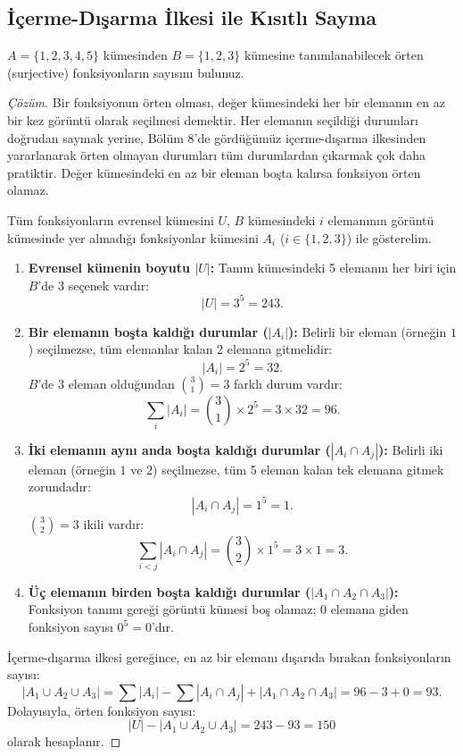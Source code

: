 \subsection{İçerme-Dışarma İlkesi ile Kısıtlı Sayma}

\begin{example}
$A = \{1, 2, 3, 4, 5\}$ kümesinden $B = \{1, 2, 3\}$ kümesine tanımlanabilecek örten (surjective) fonksiyonların sayısını bulunuz.
\end{example}

\begin{proof}[Çözüm]
Bir fonksiyonun örten olması, değer kümesindeki her bir elemanın en az bir kez görüntü olarak seçilmesi demektir. Her elemanın seçildiği durumları doğrudan saymak yerine, Bölüm 8'de gördüğümüz içerme-dışarma ilkesinden yararlanarak örten olmayan durumları tüm durumlardan çıkarmak çok daha pratiktir. Değer kümesindeki en az bir eleman boşta kalırsa fonksiyon örten olamaz.

Tüm fonksiyonların evrensel kümesini $U$, $B$ kümesindeki $i$ elemanının görüntü kümesinde yer almadığı fonksiyonlar kümesini $A_i$ ($i \in \{1, 2, 3\}$) ile gösterelim.

\begin{enumerate}
    \item \textbf{Evrensel kümenin boyutu $|U|$:}
    Tanım kümesindeki 5 elemanın her biri için $B$'de 3 seçenek vardır:
    \[
    |U| = 3^5 = 243.
    \]

    \item \textbf{Bir elemanın boşta kaldığı durumlar ($|A_i|$):}
    Belirli bir eleman (örneğin $1$) seçilmezse, tüm elemanlar kalan 2 elemana gitmelidir:
    \[
    |A_i| = 2^5 = 32.
    \]
    $B$'de 3 eleman olduğundan $\binom{3}{1} = 3$ farklı durum vardır:
    \[
    \sum_{i} |A_i| = \binom{3}{1} \times 2^5 = 3 \times 32 = 96.
    \]

    \item \textbf{İki elemanın aynı anda boşta kaldığı durumlar ($|A_i \cap A_j|$):}
    Belirli iki eleman (örneğin $1$ ve $2$) seçilmezse, tüm 5 eleman kalan tek elemana gitmek zorundadır:
    \[
    |A_i \cap A_j| = 1^5 = 1.
    \]
    $\binom{3}{2} = 3$ ikili vardır:
    \[
    \sum_{i < j} |A_i \cap A_j| = \binom{3}{2} \times 1^5 = 3 \times 1 = 3.
    \]

    \item \textbf{Üç elemanın birden boşta kaldığı durumlar ($|A_1 \cap A_2 \cap A_3|$):}
    Fonksiyon tanımı gereği görüntü kümesi boş olamaz; 0 elemana giden fonksiyon sayısı $0^5 = 0$'dır.
\end{enumerate}

İçerme-dışarma ilkesi gereğince, en az bir elemanı dışarıda bırakan fonksiyonların sayısı:
\[
|A_1 \cup A_2 \cup A_3| = \sum |A_i| - \sum |A_i \cap A_j| + |A_1 \cap A_2 \cap A_3| = 96 - 3 + 0 = 93.
\]
Dolayısıyla, örten fonksiyon sayısı:
\[
|U| - |A_1 \cup A_2 \cup A_3| = 243 - 93 = 150
\]
olarak hesaplanır.
\end{proof}

